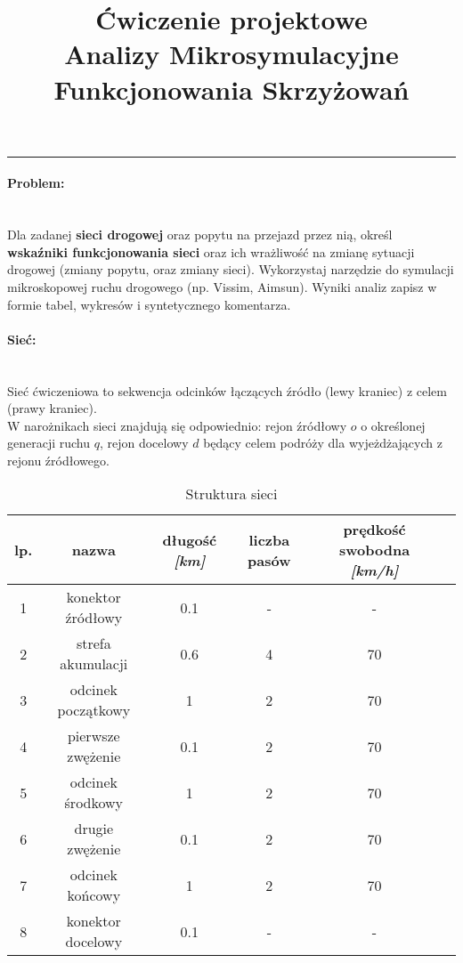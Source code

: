 \documentclass[11pt,a4paper]{article}
\date{\vspace{-14ex}}
\begin{document}
\title{\Large \textbf{Ćwiczenie projektowe} \\Analizy Mikrosymulacyjne Funkcjonowania Skrzyżowań}
\maketitle
\noindent\rule{16.9cm}{1pt}


\paragraph*{Problem:}
~\\
Dla zadanej \textbf{sieci drogowej} oraz popytu na przejazd przez nią, określ \textbf{wskaźniki funkcjonowania sieci} oraz ich wrażliwość na zmianę sytuacji drogowej (zmiany popytu, oraz zmiany sieci).
Wykorzystaj narzędzie do symulacji mikroskopowej ruchu drogowego (np. Vissim, Aimsun).
Wyniki analiz zapisz w formie tabel, wykresów i syntetycznego komentarza.

\paragraph*{Sieć:}
~\\
Sieć ćwiczeniowa to sekwencja odcinków łączących źródło (lewy kraniec) z celem (prawy kraniec).\\
W narożnikach sieci znajdują się odpowiednio: rejon źródłowy $o$ o określonej generacji ruchu $q$, rejon docelowy $d$ będący celem podróży dla wyjeżdżających z rejonu źródłowego.\\

\begin{table}[H]
\begin{center}
\caption{Struktura sieci}
\begin{tabular}{|c|c|c|c|c|c|}
\hline 
lp. & nazwa & długość \textit{[km]} & liczba pasów & prędkość swobodna \textit{[km/h]} \\ 
\hline 
1 & konektor źródłowy & 0.1 & - &  - \\ 
\hline 
2 & strefa akumulacji  & 0.6 & 4 &  70  \\ 
\hline 
3 & odcinek początkowy & 1 & 2  & 70  \\ 
\hline 
4 & pierwsze zwężenie & 0.1 & 2 & 70  \\ 
\hline 
5 & odcinek środkowy  & 1 & 2 & 70   \\ 
\hline 
6 & drugie zwężenie & 0.1 & 2 & 70   \\ 
\hline 
7 & odcinek końcowy & 1 & 2  & 70  \\ 
\hline 
8 & konektor docelowy & 0.1 & -  & -  \\ 
\hline 
\end{tabular} 
\end{center}
\end{table}
\end{document}
